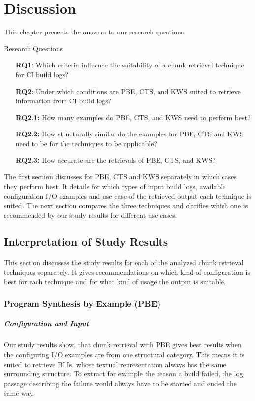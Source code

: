 \documentclass[\myrootdir/main.tex]{subfiles}
\begin{document}
\chapter{Discussion}
\label{sec:discussion}

This chapter presents the answers to our research questions:
\begin{simplebox}{Research Questions}
\begin{itemize}
  \item[\textbf{RQ1:}] Which criteria influence the suitability of a chunk retrieval technique for CI build logs?
  \item[\textbf{RQ2:}] Under which conditions are PBE, CTS, and KWS suited to retrieve information from CI build logs?
  \item[\textbf{RQ2.1:}] How many examples do PBE, CTS, and KWS need to perform best?
  \item[\textbf{RQ2.2:}] How structurally similar do the examples for PBE, CTS and KWS need to be for the techniques to be applicable?
  \item[\textbf{RQ2.3:}] How accurate are the retrievals of PBE, CTS, and KWS?
\end{itemize}
\end{simplebox}

The first section discusses for PBE, CTS and KWS separately in which cases they perform best.
It details for which types of input build logs, available configuration I/O examples and use case of the retrieved output each technique is suited.
The next section compares the three techniques and clarifies which one is recommended by our study results for different use cases.

\section{Interpretation of Study Results}
This section discusses the study results for each of the analyzed chunk retrieval techniques separately.
It gives recommendations on which kind of configuration is best for each technique and for what kind of usage the output is suitable.

\subsection{Program Synthesis by Example (PBE)}
\paragraph{Configuration and Input}
Our study results show, that chunk retrieval with PBE gives best results when the configuring I/O examples are from one structural category.
This means it is suited to retrieve BLIs, whose textual representation always has the same surrounding structure.
To extract for example the reason a build failed, the log passage describing the failure would always have to be started and ended the same way.
\end{document}
